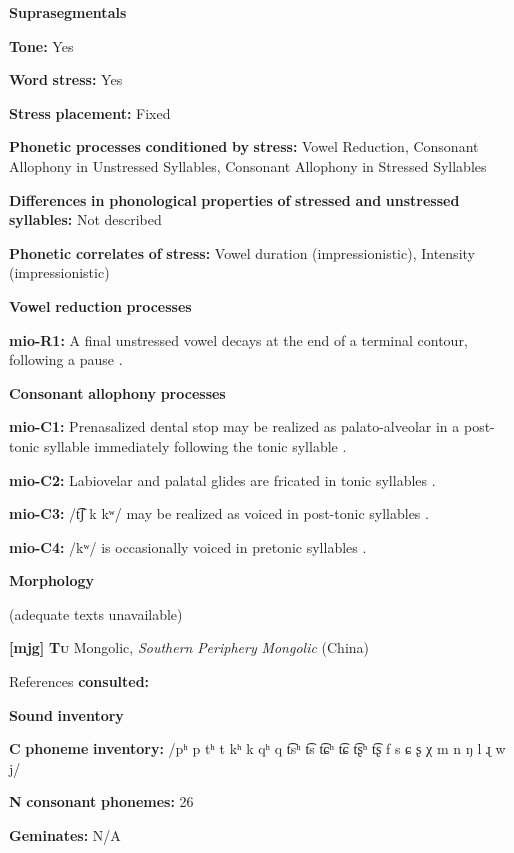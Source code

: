 \begin{styleBody}
\textbf{Suprasegmentals}

\textbf{Tone:} Yes

\textbf{Word} \textbf{stress:} Yes

\textbf{Stress} \textbf{placement:} Fixed

\textbf{Phonetic} \textbf{processes} \textbf{conditioned} \textbf{by} \textbf{stress:} Vowel Reduction, Consonant Allophony in Unstressed Syllables, Consonant Allophony in Stressed Syllables

\textbf{Differences} \textbf{in} \textbf{phonological} \textbf{properties} \textbf{of} \textbf{stressed} \textbf{and} \textbf{unstressed} \textbf{syllables:} Not described

\textbf{Phonetic} \textbf{correlates} \textbf{of} \textbf{stress:} Vowel duration (impressionistic), Intensity (impressionistic)

\textbf{Vowel} \textbf{reduction} \textbf{processes}

\textbf{mio-R1:} A final unstressed vowel decays at the end of a terminal contour, following a pause \citep[13]{Bradley1970}.

\textbf{Consonant} \textbf{allophony} \textbf{processes}

\textbf{mio-C1:} Prenasalized dental stop may be realized as palato-alveolar in a post-tonic syllable immediately following the tonic syllable \citep[6]{Bradley1970}.

\textbf{mio-C2:} Labiovelar and palatal glides are fricated in tonic syllables \citep[8]{Bradley1970}.

\textbf{mio-C3:} /t͡ʃ k kʷ/ may be realized as voiced in post-tonic syllables \citep[5]{Bradley1970}.

\textbf{mio-C4:} /kʷ/ is occasionally voiced in pretonic syllables \citep[5]{Bradley1970}.

\textbf{Morphology}

(adequate texts unavailable)

\textbf{[mjg]}   \textbf{\textsc{Tu}}    Mongolic, \textit{Southern} \textit{Periphery} \textit{Mongolic} (China)

References \textbf{consulted:} \citet{Slater2003}

\textbf{Sound} \textbf{inventory}

\textbf{C} \textbf{phoneme} \textbf{inventory:} /pʰ p tʰ t kʰ k qʰ q t͡sʰ t͡s t͡ɕʰ t͡ɕ t͡ʂʰ t͡ʂ f s ɕ ʂ χ m n ŋ l ɻ w j/

\textbf{N} \textbf{consonant} \textbf{phonemes:} 26

\textbf{Geminates:} N/A


\end{styleBody}
